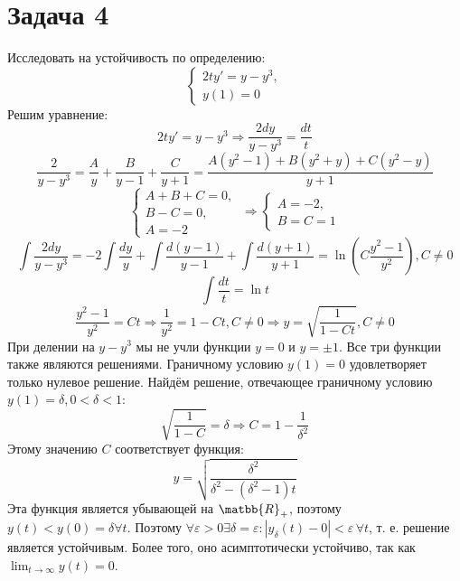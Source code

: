 \documentclass[11pt]{article}
\begin{document}
\section{Задача 4}
\label{sec:org98bebd5}
Исследовать на устойчивость по определению:
\begin{equation*}
\begin{cases}
2ty' = y - y^3, \\
y(1) = 0
\end{cases}
\end{equation*}
Решим уравнение:
$$2ty' = y - y^3 \Rightarrow \frac{2dy}{y - y^3} = \frac{dt}t$$
$$\frac{2}{y - y^3} = \frac{A}{y} + \frac{B}{y - 1} + \frac{C}{y + 1} =
\frac{A(y^2 - 1) + B(y^2 + y) + C(y^2 - y)}{y + 1}$$
\begin{equation*}
\begin{cases}
A + B + C = 0, \\
B - C = 0, \\
A = -2
\end{cases}\
\Rightarrow
\begin{cases}
A = -2, \\
B = C = 1
\end{cases}
\end{equation*}
$$\int\frac{2dy}{y - y^3} = -2\int\frac{dy}y + \int\frac{d(y - 1)}{y - 1} +
\int\frac{d(y + 1)}{y + 1} = \ln\left(C\frac{y^2 - 1}{y^2}\right), C \neq 0$$
$$\int\frac{dt}t = \ln t$$
$$\frac{y^2 - 1}{y^2} = Ct \Rightarrow \frac{1}{y^2} = 1 - Ct, C \neq 0 \Rightarrow
y = \sqrt{\frac{1}{1 - Ct}}, C \neq 0$$
При делении на \(y - y^3\) мы не учли функции \(y = 0\) и \(y = \pm 1\). Все три функции также
являются решениями.
Граничному условию \(y(1) = 0\) удовлетворяет только нулевое решение. Найдём решение, отвечающее
граничному условию \(y(1) = \delta, 0 < \delta < 1\):
$$\sqrt{\frac{1}{1 - C}} = \delta \Rightarrow C = 1 - \frac{1}{\delta^2}$$
Этому значению \(C\) соответствует функция:
$$y = \sqrt{\frac{\delta^2}{\delta^2 - (\delta^2 - 1)t}}$$
Эта функция является убывающей на \(\matbb{R}_+\), поэтому \(y(t) < y(0) = \delta \forall t\).
Поэтому \(\forall \varepsilon > 0 \exists \delta = \varepsilon: |y_{\delta}(t) - 0| < \varepsilon\, \forall t\),
т. е. решение является устойчивым. Более того, оно асимптотически устойчиво, так как \(\lim_{t \to \infty}y(t) = 0\).
\end{document}
